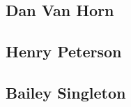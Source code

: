 \documentclass[draftclsnofoot,onecolumn,journal,letterpaper,compsoc,10pt]{IEEEtran}
\newcounter{subsubsubsection}[subsubsection]
\newcounter{subsubsubsubsection}[subsubsubsection]
\begin{document}
\subsection{Dan Van Horn}
{
    \let\section\subsubsection
    \let\subsection\subsubsubsection
    \let\subsubsection\subsubsubsubsection
    
}

\subsection{Henry Peterson}
{
    \let\section\subsubsection
    \let\subsection\subsubsubsection
    \let\subsubsection\subsubsubsubsection
    
}

\subsection{Bailey Singleton}
{
    \let\section\subsubsection
    \let\subsection\subsubsubsection
    \let\subsubsection\subsubsubsubsection
    
}
\end{document}
